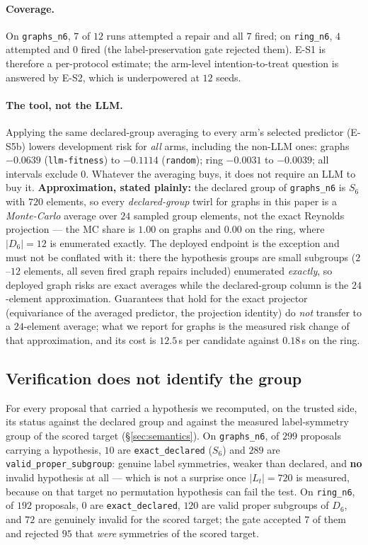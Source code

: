 \documentclass{neurips_2024}
\begin{document}
\paragraph{Coverage.} On \texttt{graphs\_n6}, $7$ of $12$ runs attempted a repair and all
$7$ fired; on \texttt{ring\_n6}, $4$ attempted and $0$ fired (the label-preservation gate
rejected them). E-S1 is therefore a per-protocol estimate; the arm-level intention-to-treat
question is answered by E-S2, which is underpowered at $12$ seeds.

\paragraph{The tool, not the LLM.} Applying the same declared-group averaging to every
arm's selected predictor (E-S5b) lowers development risk for \emph{all} arms, including
the non-LLM ones: graphs $-0.0639$ (\texttt{llm-fitness}) to $-0.1114$ (\texttt{random});
ring $-0.0031$ to $-0.0039$; all intervals exclude $0$. Whatever the averaging buys, it
does not require an LLM to buy it. \textbf{Approximation, stated plainly:} the declared
group of \texttt{graphs\_n6} is $S_6$ with $720$ elements, so every \emph{declared-group}
twirl for graphs in this paper is a \emph{Monte-Carlo} average over $24$ sampled group
elements, not the exact Reynolds projection --- the MC share is $1.00$ on graphs and $0.00$
on the ring, where $|D_6| = 12$ is enumerated exactly. The deployed endpoint is the
exception and must not be conflated with it: there the hypothesis groups are small subgroups
($2$--$12$ elements, all seven fired graph repairs included) enumerated \emph{exactly}, so
deployed graph risks are exact averages while the declared-group column is the
$24$-element approximation. Guarantees that hold for the exact projector
(equivariance of the averaged predictor, the projection identity) do \emph{not} transfer to
a $24$-element average; what we report for graphs is the measured risk change of that
approximation, and its cost is $12.5$\,s per candidate against $0.18$\,s on the ring.

\subsection{Verification does not identify the group}
\label{sec:selectivity}

For every proposal that carried a hypothesis we recomputed, on the trusted side, its status
against the declared group and against the measured label-symmetry group of the scored
target (\S\ref{sec:semantics}). On \texttt{graphs\_n6}, of $299$ proposals carrying a
hypothesis, $10$ are \texttt{exact\_declared} ($S_6$) and $289$ are
\texttt{valid\_proper\_subgroup}: genuine label symmetries, weaker than declared, and
\textbf{no} invalid hypothesis at all --- which is not a surprise once $|L_t| = 720$ is
measured, because on that target no permutation hypothesis can fail the test. On
\texttt{ring\_n6}, of $192$ proposals, $0$ are \texttt{exact\_declared}, $120$ are valid
proper subgroups of $D_6$, and $72$ are genuinely invalid for the scored target; the gate
accepted $7$ of them and rejected $95$ that \emph{were} symmetries of the scored target.
\end{document}
